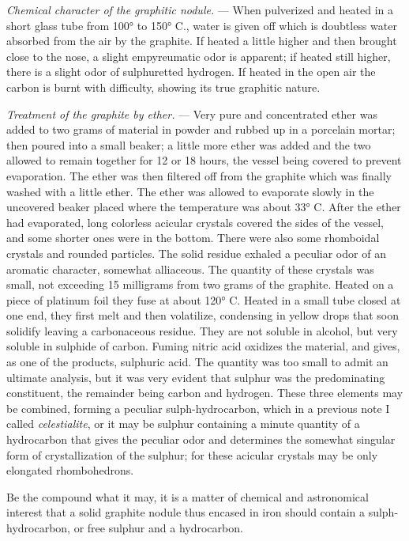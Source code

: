 \documentclass[a4paper, 11pt, oneside, english]{article}
\begin{document}
\emph{Chemical character of the graphitic nodule.} --- When pulverized and heated in a short glass tube from 100° to 150° C., water is given off which is doubtless water absorbed from the air by the graphite. If heated a little higher and then brought close to the nose, a slight empyreumatic odor is apparent; if heated still higher, there is a slight odor of sulphuretted hydrogen. If heated in the open air the carbon is burnt with difficulty, showing its true graphitic nature.

\emph{Treatment of the graphite by ether.} --- Very pure and concentrated ether was added to two grams of material in powder and rubbed up in a porcelain mortar; then poured into a small beaker; a little more ether was added and the two allowed to remain together for 12 or 18 hours, the vessel being covered to prevent evaporation. The ether was then filtered off from the graphite which was finally washed with a little ether. The ether was allowed to evaporate slowly in the uncovered beaker placed where the temperature was about 33° C. After the ether had evaporated, long colorless acicular crystals covered the sides of the vessel, and some shorter ones were in the bottom. There were also some rhomboidal crystals and rounded particles. The solid residue exhaled a peculiar odor of an aromatic character, somewhat alliaceous. The quantity of these crystals was small, not exceeding 15 milligrams from two grams of the graphite. Heated on a piece of platinum foil they fuse at about 120° C. Heated in a small tube closed at one end, they first melt and then volatilize, condensing in yellow drops that soon solidify leaving a carbonaceous residue. They are not soluble in alcohol, but very soluble in sulphide of carbon. Fuming nitric acid oxidizes the material, and gives, as one of the products, sulphuric acid. The quantity was too small to admit an ultimate analysis, but it was very evident that sulphur was the predominating constituent, the remainder being carbon and hydrogen. These three elements may be combined, forming a peculiar sulph-hydrocarbon, which in a previous note I called \emph{celestialite}, or it may be sulphur containing a minute quantity of a hydrocarbon that gives the peculiar odor and determines the somewhat singular form of crystallization of the sulphur; for these acicular crystals may be only elongated rhombohedrons.

Be the compound what it may, it is a matter of chemical and astronomical interest that a solid graphite nodule thus encased in iron should contain a sulph-hydrocarbon, or free sulphur and a hydrocarbon.
\end{document}
